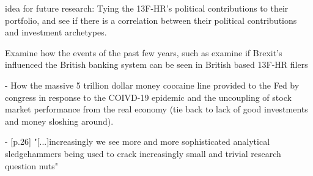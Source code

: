 idea for future research: Tying the 13F-HR's political contributions to their portfolio, and see if there is a correlation between their political contributions and investment archetypes.

Examine how the events of the past few years, such as examine if Brexit's influenced the British banking system can be seen in British based 13F-HR filers

- How the massive 5 trillion dollar money coccaine line provided to the Fed by congress in response to the COIVD-19 epidemic and the uncoupling of stock market performance from the real economy (tie back to lack of good investments and money sloshing around). 










- \cite{harrison2019venture}[p.26] "[...]increasingly we see more and more sophisticated analytical sledgehammers being used to crack increasingly small and trivial research question nuts"

